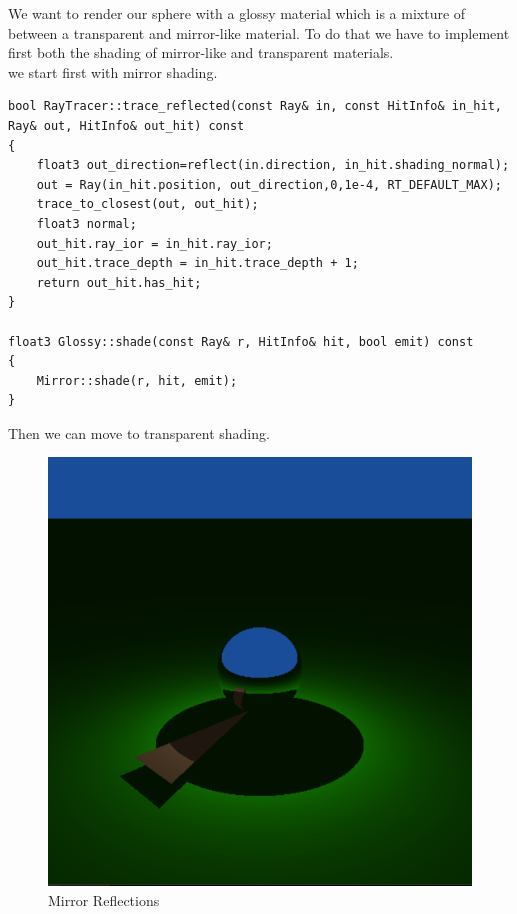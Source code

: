 We want to render our sphere with a glossy material which is a mixture of between a transparent and mirror-like material. To do that we have to implement first both the shading of mirror-like and transparent materials.\\
we start first with mirror shading.
\begin{lstlisting}
bool RayTracer::trace_reflected(const Ray& in, const HitInfo& in_hit, Ray& out, HitInfo& out_hit) const
{
	float3 out_direction=reflect(in.direction, in_hit.shading_normal);
	out = Ray(in_hit.position, out_direction,0,1e-4, RT_DEFAULT_MAX);
	trace_to_closest(out, out_hit);
	float3 normal;
	out_hit.ray_ior = in_hit.ray_ior;
	out_hit.trace_depth = in_hit.trace_depth + 1;
	return out_hit.has_hit;
}

float3 Glossy::shade(const Ray& r, HitInfo& hit, bool emit) const
{
	Mirror::shade(r, hit, emit);
}
\end{lstlisting}
Then we can move to transparent shading.
\begin{figure}[H]
	\centering
	\includegraphics[scale=\imagescale]{images/worksheet_2/part_2}
	\caption{Mirror Reflections}
	\label{fig:mirror_reflections}
\end{figure}

